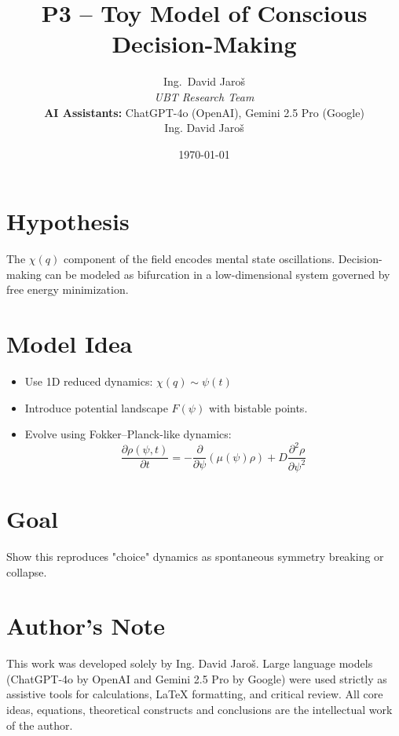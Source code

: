 \documentclass[12pt]{article}
\title{P3 – Toy Model of Conscious Decision-Making}
\author{
Ing.~David Jaroš \\
\textit{UBT Research Team} \\
\textbf{AI Assistants:} ChatGPT-4o (OpenAI), Gemini 2.5 Pro (Google) \\
Ing. David Jaroš}
\date{\today}
\begin{document}
\maketitle

\section*{Hypothesis}
The $\chi(q)$ component of the field encodes mental state oscillations. Decision-making can be modeled as bifurcation in a low-dimensional system governed by free energy minimization.

\section*{Model Idea}
\begin{itemize}
\item Use 1D reduced dynamics: $\chi(q) \sim \psi(t)$
\item Introduce potential landscape $F(\psi)$ with bistable points.
\item Evolve using Fokker–Planck-like dynamics:
\[
\frac{\partial \rho(\psi,t)}{\partial t} = -\frac{\partial}{\partial \psi} \left( \mu(\psi) \rho \right) + D \frac{\partial^2 \rho}{\partial \psi^2}
\]
\end{itemize}

\section*{Goal}
Show this reproduces "choice" dynamics as spontaneous symmetry breaking or collapse.


\section*{Author's Note}

This work was developed solely by Ing. David Jaroš.  
Large language models (ChatGPT-4o by OpenAI and Gemini 2.5 Pro by Google) were used strictly as assistive tools for calculations, LaTeX formatting, and critical review.  
All core ideas, equations, theoretical constructs and conclusions are the intellectual work of the author.
\end{document}
